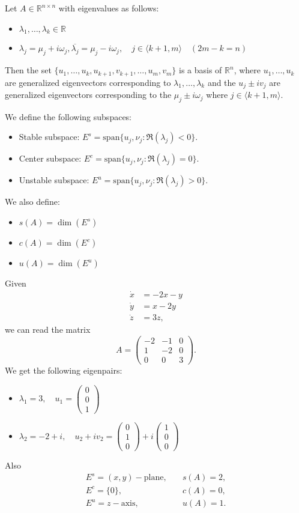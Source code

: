 \documentclass{article}
\newcommand*{\R}{\mathbb{R}}
\newcommand*{\jbr}[1]{{\langle #1 \rangle}}
\newcommand*{\spanl}{\text{span}}
\newcommand{\vecthree}[3]{\begin{pmatrix} #1\\#2\\#3\end{pmatrix}}
\newcommand*{\matthree}[9]{\begin{pmatrix}
    #1&#2&#3\\#4&#5&#6\\#7&#8&#9
\end{pmatrix}}
\begin{document}
\begin{thm}
    Let $A\in \R^{n\times n}$ with eigenvalues as follows:
    \begin{itemize}
        \item $\lambda_1,\dots,\lambda_k\in\R$

        \item $\lambda_j=\mu_j+i\omega_j, \overline{\lambda_j}=\mu_j-i\omega_j, \quad j\in\jbr{k+1,m}\quad (2m-k=n)$
    \end{itemize}

    Then the set $\{u_1,\dots,u_k,u_{k+1},v_{k+1},\dots,u_m,v_m\}$ is a basis of $\R^n$, where $u_1, \dots,u_k$ are generalized eigenvectors corresponding to $\lambda_1, \dots, \lambda_k$ and the $u_j\pm i v_j$ are generalized eigenvectors corresponding to the $\mu_j \pm i\omega_j$ where $j\in\jbr{k+1,m}$.
\end{thm}

\begin{defin}
    We define the following subspaces:
    \begin{itemize}
        \item Stable subspace: $E^s=\spanl\{u_j,\nu_j:\Re(\lambda_j)<0\}$.

        \item Center subspace: $E^c=\spanl\{u_j,\nu_j:\Re(\lambda_j)=0\}$.

        \item Unstable subspace: $E^u=\spanl\{u_j,\nu_j:\Re(\lambda_j)>0\}$.
    \end{itemize}
    We also define:
    \begin{itemize}
        \item $s(A) = \dim(E^s)$

        \item $c(A) = \dim(E^c)$

        \item $u(A) = \dim(E^u)$
    \end{itemize}
\end{defin}

\begin{exam}
    Given
    $$\begin{aligned}
    \dot x&=-2x-y\\
    \dot y &= x-2y\\
    \dot z &= 3z,
    \end{aligned}$$
    we can read the matrix
    $$A=\matthree{-2}{-1}{0}{1}{-2}{0}{0}{0}{3}.$$
    We get the following eigenpairs:
    \begin{itemize}
        \item $\lambda_1 = 3, \quad u_1 =\vecthree001$

        \item $\lambda_2 = -2+i, \quad u_2+iv_2 = \vecthree010+i\vecthree100$
    \end{itemize}
    Also
    $$\begin{array}{ll}E^s=(x,y)-\text{plane}, &\quad s(A) = 2,\\
    E^c=\{0\}, &\quad c(A)=0,\\
    E^u=z-\text{axis}, &\quad u(A)=1.
    \end{array}$$
\end{exam}
\end{document}
